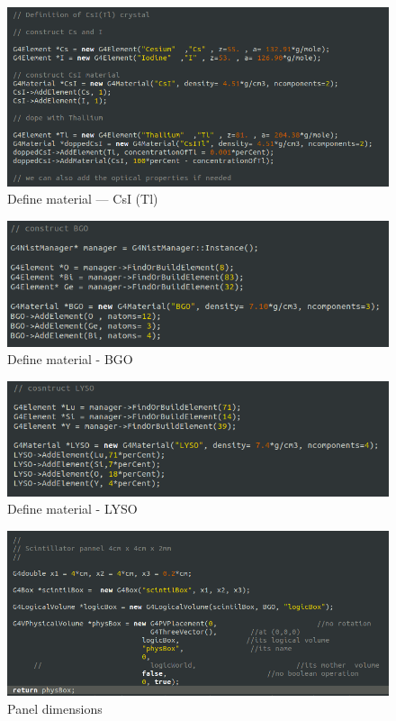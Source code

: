 \documentclass{article}
\begin{document}
\begin{figure}[H]
    \centering
    \includegraphics[width=\linewidth]{images//task1/material_CSI.png}
    \caption{Define material --- CsI (Tl)}
    \label{fig:matCSI}
\end{figure}
\begin{figure}[H]
        \centering
        \includegraphics[width=\linewidth]{images//task1/material_BGO.png}
        \caption{Define material - BGO}
        \label{fig:matBGO}
\end{figure}
\begin{figure}[H]
    \centering
    \includegraphics[width=\linewidth]{images//task1/material_LYSO.png}
    \caption{Define material - LYSO}
    \label{fig:matLYSO}
\end{figure}
\begin{figure}[H]
    \centering
    \includegraphics[width=1\linewidth]{images//task1/pannel_dimensions.png}
    \caption{Panel dimensions}
    \label{fig:dimensions}
\end{figure}
\end{document}
